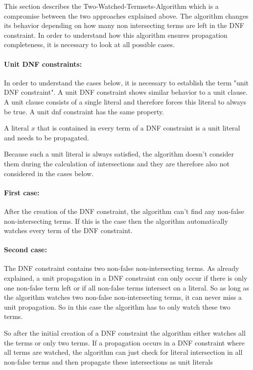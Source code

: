 This section describes the Two-Watched-Termsets-Algorithm which is a compromise between the two approaches explained above. The algorithm changes its behavior depending on how many non intersecting terms are left in the DNF constraint. In order to understand how this algorithm ensures propagation completeness, it is necessary to look at all possible cases.

\paragraph{Unit DNF constraints:} In order to understand the cases below, it is necessary to establish the term "unit DNF constraint". A unit DNF constraint shows similar behavior to a unit clause. A unit clause consists of a single literal and therefore forces this literal to always be true. A unit dnf constraint has the same property.
\begin{leftbar}
A literal $x$ that is contained in every term of a DNF constraint is a unit literal and needs to be propagated.
\end{leftbar}

Because such a unit literal is always satisfied, the algorithm doesn't consider them during the calculation of intersections and they are therefore also not considered in the cases below.


\paragraph{First case:} After the creation of the DNF constraint, the algorithm can't find any non-false non-intersecting terms. If this is the case then the algorithm automatically watches every term of the DNF constraint.

\paragraph{Second case:} The DNF constraint contains two non-false non-intersecting terms. As already explained, a unit propagation in a DNF constraint can only occur if there is only one non-false term left or if all non-false terms intersect on a literal. So as long as the algorithm watches two non-false non-intersecting terms, it can never miss a unit propagation. So in this case the algorithm has to only watch these two terms.

So after the initial creation of a DNF constraint the algorithm either watches all the terms or only two terms. If a propagation occurs in a DNF constraint where all terms are watched, the algorithm can just check for literal intersection in all non-false terms and then propagate these intersections as unit literals

